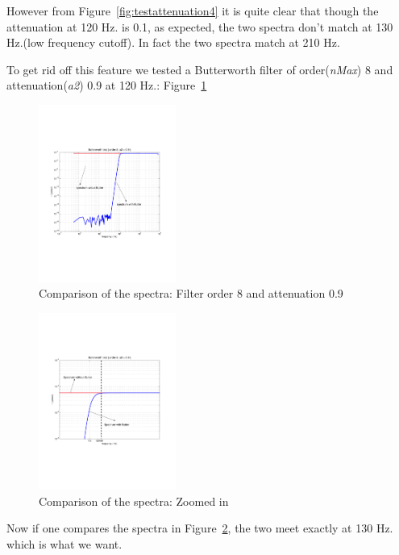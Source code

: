 However from Figure~\ref{fig:testattenuation4} it is quite clear that though 
the attenuation  at 120 Hz. is 0.1, as expected, the two spectra don't match 
at 130 Hz.(low frequency cutoff). In fact the two spectra match at 210 Hz.

To get rid off this feature we tested a Butterworth filter of 
order(\emph{nMax}) 8 and attenuation(\emph{a2}) 0.9 at 120 Hz.: 
Figure~\ref{fig:testattenuation8_9}
\begin{figure}
\centering
\includegraphics[width=0.4\textwidth]{figures/testattenuation8_9}
\caption{Comparison of the spectra: Filter order 8 and attenuation 0.9}
\label{fig:testattenuation8_9}
\end{figure}

\begin{figure}
\centering
\includegraphics[width=0.4\textwidth]{figures/testattenuation8_9zoomed}
\caption{Comparison of the spectra: Zoomed in}\label{fig:testattenuation8_9zoomed}
\end{figure}

Now if one compares the spectra in Figure~\ref{fig:testattenuation8_9zoomed},
the two meet exactly at 130 Hz. which is what we want. 

